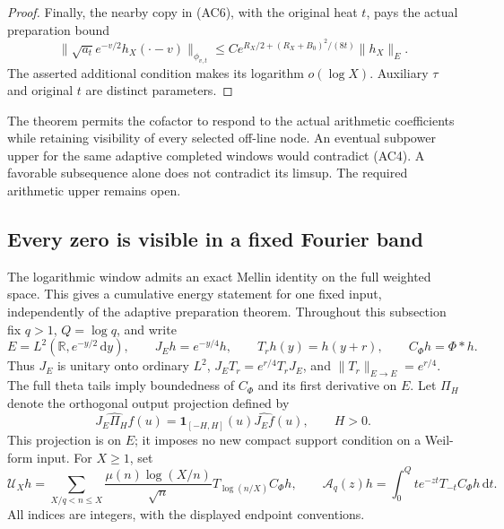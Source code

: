 \documentclass[11pt]{article}
\theoremstyle{remark}\newtheorem{remark}[theorem]{Remark}
\newcommand{\R}{\mathbb R}
\newcommand{\dd}{\,\mathrm d}
\begin{document}
\begin{proof}
Finally, the nearby copy in (AC6), with the original heat \(t\), pays
the actual preparation bound
\[
 \|\sqrt{a_t}e^{-v/2}h_X(\cdot-v)\|_{\phi_{v,t}}
   \le C e^{R_X/2+(R_X+B_0)^2/(8t)}\|h_X\|_E .           \tag{AC10}
\]
The asserted additional condition makes its logarithm \(o(\log X)\).
Auxiliary \(\tau\) and original \(t\) are distinct parameters.
\end{proof}

The theorem permits the cofactor to respond to the actual arithmetic
coefficients while retaining visibility of every selected off-line node.
An eventual subpower upper for the same adaptive completed windows
would contradict (AC4). A favorable subsequence alone does not
contradict its limsup. The required arithmetic upper remains open.

\subsection{Every zero is visible in a fixed Fourier band}
\label{sec:fixed-band-source}

The logarithmic window admits an exact Mellin identity on the full
weighted space. This gives a cumulative energy statement for one
fixed input, independently of the adaptive preparation theorem.
Throughout this subsection fix \(q>1\), \(Q=\log q\), and write
\[
 E=L^2(\R,e^{-y/2}\dd y),\qquad J_Eh=e^{-y/4}h,\qquad
 T_rh(y)=h(y+r),\qquad C_\Phi h=\Phi*h .
\]
Thus \(J_E\) is unitary onto ordinary \(L^2\),
\(J_ET_r=e^{r/4}T_rJ_E\), and
\(\|T_r\|_{E\to E}=e^{r/4}\).
The full theta tails imply boundedness of \(C_\Phi\) and its
first derivative on \(E\). Let \(\Pi_H\) denote the orthogonal
output projection defined by
\[
 \widehat{J_E\Pi_Hf}(u)=\mathbf1_{[-H,H]}(u)\widehat{J_Ef}(u),
 \qquad H>0 .
\]
This projection is on \(E\); it imposes no new compact support
condition on a Weil-form input. For \(X\ge1\), set
\[
 \mathcal U_Xh=
 \sum_{X/q<n\le X}\frac{\mu(n)\log(X/n)}{\sqrt n}
                     T_{\log(n/X)}C_\Phi h,\qquad
 \mathcal A_q(z)h=\int_0^Q t e^{-zt}T_{-t}C_\Phi h\dd t .
 \tag{FB1}\label{eq:fixed-band-source}
\]
All indices are integers, with the displayed endpoint conventions.
\end{document}

